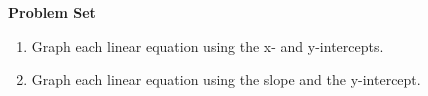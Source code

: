 \textbf{Problem Set}

\vspce

\begin{enumerate}[label = \Alph*. ]
\item \hspce Graph each linear equation using the x- and  y-intercepts.  
\begin{enumerate}[label = \arabic*. ]
\end{enumerate}  

\vspce 
\item \hspce Graph each linear equation using the slope  and the  y-intercept. 
\begin{enumerate}[label = \arabic*. ]
\end{enumerate}  

\end{enumerate}  